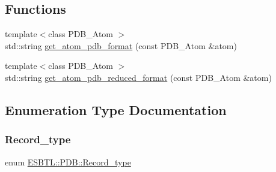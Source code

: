 \subsection*{Functions}
\begin{DoxyCompactItemize}
\item 
{\footnotesize template$<$class P\+D\+B\+\_\+\+Atom $>$ }\\std\+::string \hyperlink{namespaceESBTL_1_1PDB_aab225f56efa798130ecc440ca21c3c91}{get\+\_\+atom\+\_\+pdb\+\_\+format} (const P\+D\+B\+\_\+\+Atom \&atom)
\item 
{\footnotesize template$<$class P\+D\+B\+\_\+\+Atom $>$ }\\std\+::string \hyperlink{namespaceESBTL_1_1PDB_adbb3162c10a2e602abbf4b143eeab66f}{get\+\_\+atom\+\_\+pdb\+\_\+reduced\+\_\+format} (const P\+D\+B\+\_\+\+Atom \&atom)
\end{DoxyCompactItemize}


\subsection{Enumeration Type Documentation}
\mbox{\label{namespaceESBTL_1_1PDB_a6f11e88f706f51afbe97230641a469b7}} 
\subsubsection{\texorpdfstring{Record\+\_\+type}{Record\_type}}
{\footnotesize\ttfamily enum \hyperlink{namespaceESBTL_1_1PDB_a6f11e88f706f51afbe97230641a469b7}{E\+S\+B\+T\+L\+::\+P\+D\+B\+::\+Record\+\_\+type}}

